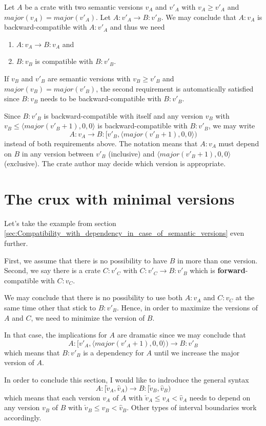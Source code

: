 \documentclass{article}
\begin{document}
    Let $A$ be a crate with two semantic versions $v_A$ and $v'_A$ with $v_A \geq v'_A$ and $major(v_A) = major(v'_A)$. Let $A:v'_A \rightarrow B:v'_B$. We may conclude that $A:v_A$ is backward-compatible with $A:v'_A$ and thus we need
    \begin{enumerate}
        \item $A:v_A \rightarrow B:v_A$ and
        \item $B:v_B$ is compatible with $B:v'_B$.
    \end{enumerate}

    If $v_B$ and $v'_B$ are semantic versions with $v_B \geq v'_B$ and $major(v_B) = major(v'_B)$, the second requirement is automatically satisfied since $B:v_B$ needs to be backward-compatible with $B:v'_B$.

    Since $B:v'_B$ is backward-compatible with itself and any version $v_B$ with $v_B \le \langle major(v'_B+1),0,0 \rangle$ is backward-compatible with $B:v'_B$, we may write
    $$
    A:v_A \rightarrow B:[v'_B, \langle major(v'_B+1),0,0 \rangle)
    $$ instead of both requirements above. The notation means that $A:v_A$ must depend on $B$ in any version between $v'_B$ (inclusive) and $\langle major(v'_B+1),0,0 \rangle$ (exclusive). The crate author may decide which version is appropriate.

    \section{The crux with minimal versions}
    Let's take the example from section \ref{sec:Compatibility_with_dependency_in_case_of_semantic_versions} even further.

    First, we assume that there is no possibility to have $B$ in more than one version. Second, we say there is a crate $C:v'_C$ with $C:v'_C \rightarrow B:v'_B$ which is \textbf{forward}-compatible with $C:v_C$.

    We may conclude that there is no possibility to use both $A:v_A$ and $C:v_C$ at the same time other that stick to $B:v'_B$. Hence, in order to maximize the versions of $A$ and $C$, we need to minimize the version of $B$.

    In that case, the implications for $A$ are dramatic since we may conclude that
    $$
    A:[v'_A, \langle major(v'_A+1),0,0 \rangle) \rightarrow B:v'_B
    $$
    which means that $B:v'_B$ is a dependency for $A$ until we increase the major version of $A$.

    In order to conclude this section, I would like to indroduce the general syntax
    $$
    A:[\check{v}_A, \hat{v}_A) \rightarrow B:[\check{v}_B, \hat{v}_B)
    $$
    which means that each version $v_A$ of $A$ with $\check{v}_A \leq v_A < \hat{v}_A$ needs to depend on any version $v_B$ of $B$ with $\check{v}_B \leq v_B < \hat{v}_B$. Other types of interval boundaries work accordingly.
\end{document}
